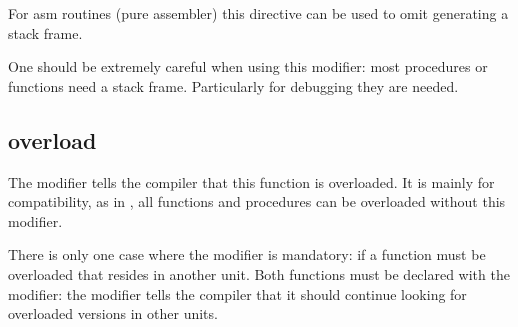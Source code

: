 For asm routines (pure assembler) this directive can be used to omit generating a
stack frame.

One should be extremely careful when using this modifier: most procedures or
functions need a stack frame. Particularly for debugging they are needed.

\subsection{overload}
\label{se:overload}
The  modifier tells the compiler that this function is
overloaded. It is mainly for \delphi compatibility, as in \fpc, all
functions and procedures can be overloaded without this modifier.

There is only one case where the  modifier is mandatory:
if a function must be overloaded that resides in another unit. Both
functions must be declared with the  modifier: the
 modifier tells the compiler that it should continue 
looking for overloaded versions in other units.

